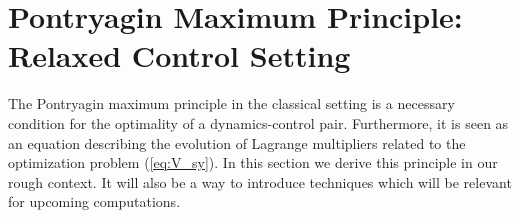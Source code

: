 \documentclass[12pt,reqno]{amsart}
\numberwithin{equation}{section}  %
\newcommand{\1}{{\bf 1}}
\newcommand{\2}{{\bf 2}}
\theoremstyle{remark}
\theoremstyle{remark}
\begin{document}

\section{Pontryagin Maximum Principle: Relaxed Control Setting}\label{sec: Pontry}

The Pontryagin maximum principle in the classical setting is a necessary condition for the optimality of a dynamics-control pair. Furthermore, it is seen as an equation describing the evolution of Lagrange multipliers related to the optimization problem (\ref{eq:V_sy}). In this section we derive this principle in our rough context. It will also be a way to introduce techniques which will be relevant for upcoming computations. 
\end{document}
